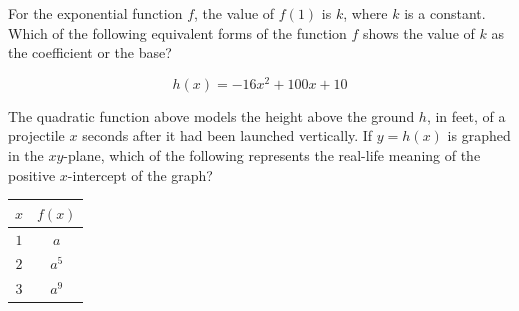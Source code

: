 \vspace{0.75em}

\newpage

\noindent\markforreview
\vspace{1em}

For the exponential function $f$, the value of $f(1)$ is $k$, where $k$ is a constant.  
Which of the following equivalent forms of the function $f$ shows the value of $k$ as the coefficient or the base?

\vspace{0.75em}


\vspace{2em}

\noindent\markforreview
\vspace{1em}

\[h(x) = -16x^2 + 100x + 10\]


The quadratic function above models the height above the ground $h$, in feet, of a projectile $x$ seconds after it had been launched vertically.  
If $y = h(x)$ is graphed in the $xy$-plane, which of the following represents the real-life meaning of the positive $x$-intercept of the graph?

\vspace{0.75em}


\newpage

\noindent\markforreview
\vspace{1em}

\begin{center}
\begin{tabular}{|c|c|}
\hline
$x$ & $f(x)$ \\
\hline
$1$ & $a$ \\
$2$ & $a^5$ \\
$3$ & $a^9$ \\
\hline
\end{tabular}
\end{center}

